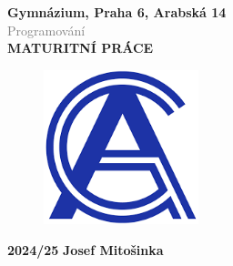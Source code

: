 \begin{titlepage}
    \begin{center}
        \vspace*{1cm}

        {\LARGE \textbf{Gymnázium, Praha 6, Arabská 14}} \\
        \vspace{0.5cm}
        \textcolor{gray}{\large Programování}
        \vspace{2cm}\\
        {\LARGE \textbf{MATURITNÍ PRÁCE}}\\
        \vspace{2cm}
        \vspace{1.5cm}
        \begin{figure}[h]
            \centering
            \includegraphics[width = 0.4\textwidth]{images/gyarablogo.png}
        \end{figure}
        \vspace{7.25cm}
        {\large \textbf{2024/25}}
        \hspace{9cm}
        {\large \textbf{Josef Mitošinka}}
        
    \end{center}
\end{titlepage}

